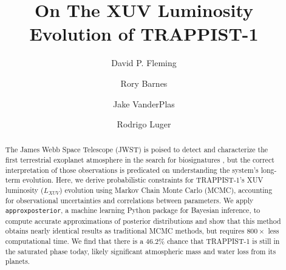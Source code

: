 \documentclass[twocolumn]{aastex62}
\newcommand{\approxposterior}[0]{\texttt{approxposterior}\xspace}
\begin{document}
\title{On The XUV Luminosity Evolution of TRAPPIST-1}



\author{David P. Fleming}

\author{Rory Barnes}

\author{Jake VanderPlas}

\author{Rodrigo Luger}


\begin{abstract}

The James Webb Space Telescope (JWST) is poised to detect and characterize the first terrestrial exoplanet atmosphere in the search for biosignatures \citep{Morley2017,Lustig2019}, but the correct interpretation of those observations is predicated on understanding the system's long-term evolution. Here, we derive probabilistic constraints for TRAPPIST-1's XUV luminosity ($L_{XUV}$) evolution using Markov Chain Monte Carlo (MCMC), accounting for observational uncertainties and correlations between parameters. We apply \approxposterior, a machine learning Python package for Bayesian inference, to compute accurate approximations of posterior distributions and show that this method obtains nearly identical results as traditional MCMC methods, but requires $800\times$ less computational time. We find that there is a $46.2\%$ chance that TRAPPIST-1 is still in the saturated phase today, likely significant atmospheric mass and water loss from its planets.

\end{abstract}


\keywords{}
\end{document}
